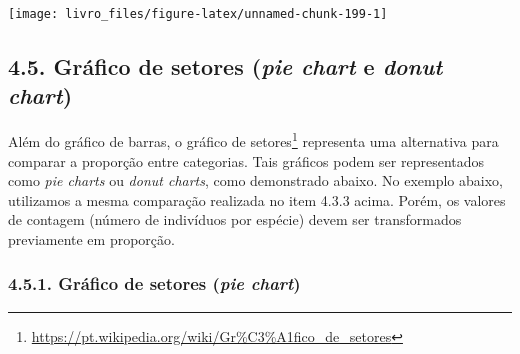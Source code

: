 \documentclass[
]{book}
\renewcommand{\href}[2]{#2\footnote{\url{#1}}}
\begin{document}
\begin{center}\texttt{[image: livro\_files/figure-latex/unnamed-chunk-199-1]} \end{center}

\hypertarget{gruxe1fico-de-setores-pie-chart-e-donut-chart}{%
\subsection{\texorpdfstring{4.5. Gráfico de setores (\emph{pie chart} e \emph{donut chart})}{4.5. Gráfico de setores (pie chart e donut chart)}}\label{gruxe1fico-de-setores-pie-chart-e-donut-chart}}

Além do gráfico de barras, o \href{https://pt.wikipedia.org/wiki/Gr\%C3\%A1fico_de_setores}{gráfico de setores} representa uma alternativa para comparar a proporção entre categorias. Tais gráficos podem ser representados como \emph{pie charts} ou \emph{donut charts}, como demonstrado abaixo. No exemplo abaixo, utilizamos a mesma comparação realizada no item 4.3.3 acima. Porém, os valores de contagem (número de indivíduos por espécie) devem ser transformados previamente em proporção.

\hypertarget{gruxe1fico-de-setores-pie-chart}{%
\subsubsection{\texorpdfstring{4.5.1. Gráfico de setores (\emph{pie chart})}{4.5.1. Gráfico de setores (pie chart)}}\label{gruxe1fico-de-setores-pie-chart}}
\end{document}
